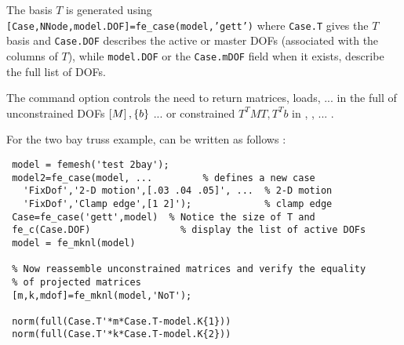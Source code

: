 The basis $T$ is generated using {\tt [Case,NNode,model.DOF]=fe\_case(model,'gett')} where {\tt Case.T} gives the $T$ basis and {\tt Case.DOF} describes the active or master DOFs (associated with the columns of $T$), while {\tt model.DOF} or the {\tt Case.mDOF} field when it exists, describe the full list of DOFs.  

The  command option controls the need to return matrices, loads, ... in the full of unconstrained DOFs $\left[M\right], \left\{b\right\}$ ... or constrained $T^TMT, T^Tb$ in \femknl, \feload, ... .

For the two bay truss example, can be written as follows : 

\begin{verbatim}
 model = femesh('test 2bay');
 model2=fe_case(model, ...         % defines a new case
   'FixDof','2-D motion',[.03 .04 .05]', ...  % 2-D motion
   'FixDof','Clamp edge',[1 2]');             % clamp edge
 Case=fe_case('gett',model)  % Notice the size of T and 
 fe_c(Case.DOF)                % display the list of active DOFs
 model = fe_mknl(model)
 
 % Now reassemble unconstrained matrices and verify the equality
 % of projected matrices
 [m,k,mdof]=fe_mknl(model,'NoT');

 norm(full(Case.T'*m*Case.T-model.K{1}))
 norm(full(Case.T'*k*Case.T-model.K{2}))
\end{verbatim}%

